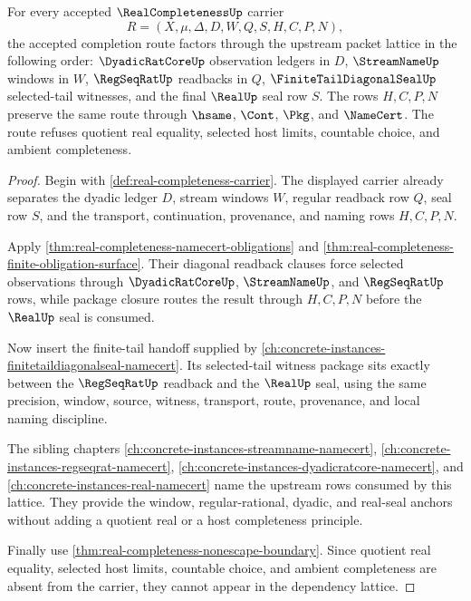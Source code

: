 \begin{theorem}
\label{thm:real-completeness-dependency-lattice}
For every accepted $\RealCompletenessUp$ carrier
$$
R=(X,\mu,\Delta,D,W,Q,S,H,C,P,N),
$$
the accepted completion route factors through the upstream packet lattice in the following order: $\DyadicRatCoreUp$ observation ledgers in $D$, $\StreamNameUp$ windows in $W$, $\RegSeqRatUp$ readbacks in $Q$, $\FiniteTailDiagonalSealUp$ selected-tail witnesses, and the final $\RealUp$ seal row $S$. The rows $H,C,P,N$ preserve the same route through $\hsame$, $\Cont$, $\Pkg$, and $\NameCert$. The route refuses quotient real equality, selected host limits, countable choice, and ambient completeness.
\end{theorem}
\begin{proof}
Begin with \autoref{def:real-completeness-carrier}. The displayed carrier already separates the dyadic ledger $D$, stream windows $W$, regular readback row $Q$, seal row $S$, and the transport, continuation, provenance, and naming rows $H,C,P,N$.

Apply \autoref{thm:real-completeness-namecert-obligations} and \autoref{thm:real-completeness-finite-obligation-surface}. Their diagonal readback clauses force selected observations through $\DyadicRatCoreUp$, $\StreamNameUp$, and $\RegSeqRatUp$ rows, while package closure routes the result through $H,C,P,N$ before the $\RealUp$ seal is consumed.

Now insert the finite-tail handoff supplied by \autoref{ch:concrete-instances-finitetaildiagonalseal-namecert}. Its selected-tail witness package sits exactly between the $\RegSeqRatUp$ readback and the $\RealUp$ seal, using the same precision, window, source, witness, transport, route, provenance, and local naming discipline.

The sibling chapters \autoref{ch:concrete-instances-streamname-namecert}, \autoref{ch:concrete-instances-regseqrat-namecert}, \autoref{ch:concrete-instances-dyadicratcore-namecert}, and \autoref{ch:concrete-instances-real-namecert} name the upstream rows consumed by this lattice. They provide the window, regular-rational, dyadic, and real-seal anchors without adding a quotient real or a host completeness principle.

Finally use \autoref{thm:real-completeness-nonescape-boundary}. Since quotient real equality, selected host limits, countable choice, and ambient completeness are absent from the carrier, they cannot appear in the dependency lattice.
\end{proof}

